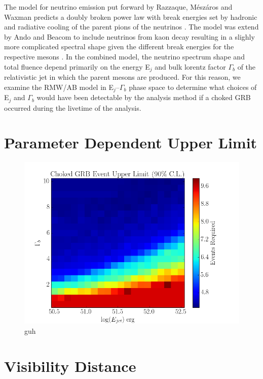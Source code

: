 \documentclass{gatech-thesis}
\begin{document}
The model for neutrino emission put forward by Razzaque, M\'{e}sz\'{a}ros and Waxman predicts a doubly broken power law with break energies set by hadronic and radiative cooling of the parent pions of the neutrinos \cite{2004PhRvL..93r1101R}. The model was extend by Ando and Beacom to include neutrinos from kaon decay resulting in a slighly more complicated spectral shape given the different break energies for the respective mesons \cite{2005PhRvL..95f1103A}. In the combined model, the neutrino spectrum shape and total fluence depend primarily on the energy E$_{j}$ and bulk lorentz factor $\Gamma_{b}$ of the relativistic jet in which the parent mesons are produced. For this reason, we examine the RMW/AB model in E$_{j}$--$\Gamma_{b}$ phase space to determine what choices of E$_{j}$ and $\Gamma_{b}$ would have been detectable by the analysis method if a choked GRB occurred during the livetime of the analysis.

\section{Parameter Dependent Upper Limit}

\begin{figure}[ht]
  \begin{center}
    \includegraphics[width=1.0\textwidth,keepaspectratio]{UpperLimit_2DHisto_SysAdj.png}
  \end{center}
  \caption{guh}
  \label{fig:ParameterDep_UL}
\end{figure}

\section{Visibility Distance}
\end{document}
